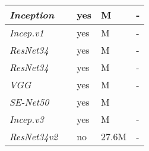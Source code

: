 \documentclass[fleqn,10pt]{SelfArx}
\begin{document}
\begin{center}
\begin{tabular}{||p{2.2cm} | p{1.3cm} | p{0.7cm} | p{1.2cm} | p{0.8cm}||}
\hline
\hline
\textit{Inception}\cite{pramerdorfer2016facial}       & \hspace{0.15cm}               & \hspace{0.12cm}yes   & \hspace{0.05cm}M & \hspace{0.4cm}-\\
\hline
\hline
\textit{Incep.v1}\cite{resmaskingnet}       & \hspace{0.15cm}               & \hspace{0.12cm}yes   & \hspace{0.32cm}M & \hspace{0.4cm}-\\
\hline
\hline
\textit{ResNet34}\cite{pramerdorfer2016facial}       & \hspace{0.15cm}               & \hspace{0.12cm}yes   & \hspace{0.12cm}M & \hspace{0.4cm}-\\
\hline
\hline
\textit{ResNet34}\cite{resmaskingnet}       & \hspace{0.15cm}               & \hspace{0.12cm}yes   & \hspace{0.12cm}M & \hspace{0.4cm}-\\
\hline
\hline
\textit{VGG}\cite{pramerdorfer2016facial}       & \hspace{0.15cm}               & \hspace{0.12cm}yes   & \hspace{0.05cm}M & \hspace{0.4cm}-\\
\hline
\hline
\textit{SE-Net50}\cite{khanzada2020facial}       & \hspace{0.15cm}               & \hspace{0.12cm}yes   & \hspace{0.27cm}M & \\
\hline
\hline
\textit{Incep.v3}\cite{resmaskingnet}       & \hspace{0.15cm}               & \hspace{0.12cm}yes   & \hspace{0.05cm}M & \hspace{0.4cm}-\\
\hline
\hline
\textit{ResNet34v2}       & \hspace{0.15cm}               & \hspace{0.15cm}no   & \hspace{0.12cm}27.6M & \hspace{0.4cm}-\\

\end{tabular}
\end{center}
\end{document}
